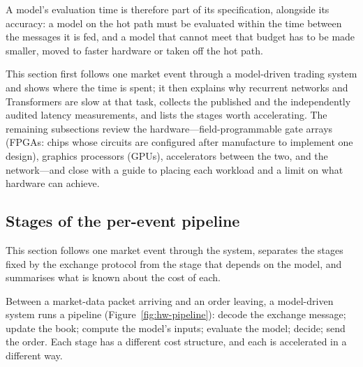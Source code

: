 A model's evaluation time is therefore part of its specification, alongside its accuracy: a model on the hot path
must be evaluated within the time between the messages it is fed, and a model that cannot meet that budget has to
be made smaller, moved to faster hardware or taken off the hot path.

This section first follows one market event through a model-driven trading system and shows where the time is
spent; it then explains why recurrent networks and Transformers are slow at that task, collects the published and
the independently audited latency measurements, and lists the stages worth accelerating. The remaining subsections
review the hardware---field-programmable gate arrays (FPGAs: chips whose circuits are configured after manufacture to
implement one design), graphics processors (GPUs), accelerators between the two, and the network---and close with a
guide to placing each workload and a limit on what hardware can achieve.

\subsection{Stages of the per-event pipeline}
\label{sec:hw-pipeline}

This section follows one market event through the system, separates the stages fixed by the exchange protocol from
the stage that depends on the model, and summarises what is known about the cost of each.

Between a market-data packet arriving and an order leaving, a model-driven system runs a pipeline
(Figure~\ref{fig:hw-pipeline}): decode the exchange message; update the book; compute the model's inputs; evaluate the
model; decide; send the order. Each stage has a different cost structure, and each is accelerated in a different way.

